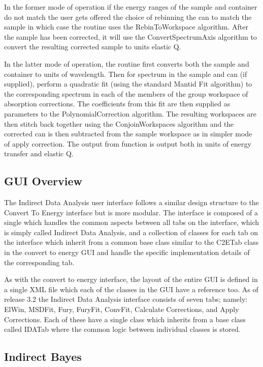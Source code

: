 \documentclass[paper=a4, fontsize=11pt]{scrartcl}	%
\numberwithin{equation}{section}															%
\numberwithin{figure}{section}																%
\numberwithin{table}{section}																%
\begin{document}
In the former mode of operation if the energy ranges of the sample and container do not match the user gets offered the choice of rebinning the can to match the sample in which case the routine uses the RebinToWorkspace algorithm. After the sample has been corrected, it will use the ConvertSpectrumAxis algorithm to convert the resulting corrected sample to units elastic Q.

In the latter mode of operation, the routine first converts both the sample and container to units of wavelength. Then for spectrum in the sample and can (if supplied), perform a quadratic fit (using the standard Mantid Fit algorithm) to the corresponding spectrum in each of the members of the group workspace of absorption corrections. The coefficients from this fit are then supplied as parameters to the PolynomialCorrection algorithm. The resulting workspaces are then stitch back together using the ConjoinWorkspaces algorithm and the corrected can is then subtracted from the sample workspace as in simpler mode of apply correction. The output from function is output both in units of energy transfer and elastic Q.

\subsection{GUI Overview}
\label{subsubsec:IDA-GUI-Overview}
The Indirect Data Analysis user interface follows a similar design structure to the Convert To Energy interface but is more modular. The interface is composed of a single which handles the common aspects between all tabs on the interface, which is simply called Indirect Data Analysis, and a collection of classes for each tab on the interface which inherit from a common base class similar to the C2ETab class in the convert to energy GUI and handle the specific implementation details of the corresponding tab.

As with the convert to energy interface, the layout of the entire GUI is defined in a single XML file which each of the classes in the GUI have a reference too. As of release 3.2 the Indirect Data Analysis interface consists of seven tabs; namely: ElWin, MSDFit, Fury, FuryFit, ConvFit, Calculate Corrections, and Apply Corrections. Each of these have a single class which inherits from a base class called IDATab where the common logic between individual classes is stored. 

\subsection{Indirect Bayes}
\end{document}
